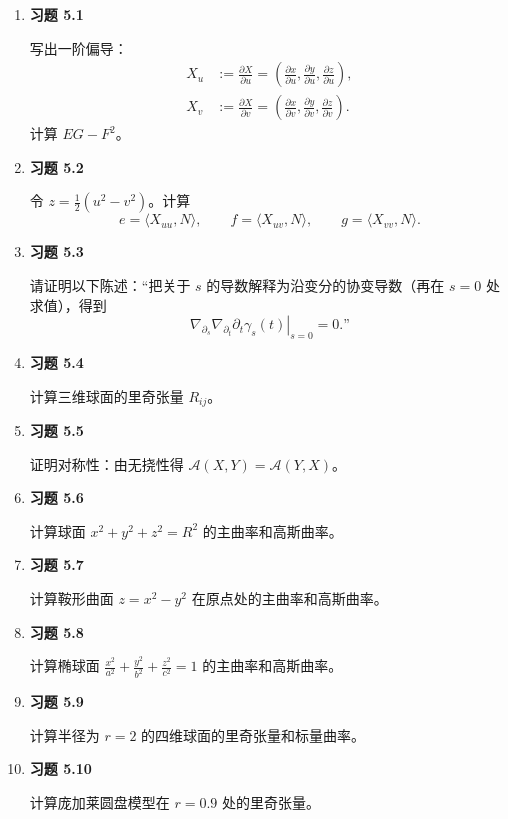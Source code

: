 \begin{enumerate}
  \item \textbf{习题 5.1}\par 写出一阶偏导：
  \[
    \begin{aligned}
      X_u&:=\frac{\partial X}{\partial u}
            =\left(\frac{\partial x}{\partial u},\frac{\partial y}{\partial u},
                    \frac{\partial z}{\partial u}\right),\\
      X_v&:=\frac{\partial X}{\partial v}
            =\left(\frac{\partial x}{\partial v},\frac{\partial y}{\partial v},
                    \frac{\partial z}{\partial v}\right).
    \end{aligned}
  \]
  计算 $EG-F^2$。
  \item \textbf{习题 5.2}\par 令 $z=\frac12(u^2-v^2)$。计算
  \[
    e=\langle X_{uu},N\rangle,\qquad
    f=\langle X_{uv},N\rangle,\qquad g=\langle X_{vv},N\rangle.
  \]
  \item \textbf{习题 5.3}\par 请证明以下陈述：“把关于 $s$ 的导数解释为沿变分的协变导数（再在 $s=0$ 处求值），得到
  \[
    \left.\nabla_{\partial_s}\nabla_{\partial_t}\partial_t\gamma_s(t)\right|_{s=0}=0.\text{”}
  \]
  \item \textbf{习题 5.4}\par 计算三维球面的里奇张量 $R_{ij}$。
  \item \textbf{习题 5.5}\par 证明对称性：由无挠性得 $\mathcal A(X,Y)=\mathcal A(Y,X)$。
  \item \textbf{习题 5.6}\par 计算球面 $x^2+y^2+z^2=R^2$ 的主曲率和高斯曲率。
  \item \textbf{习题 5.7}\par 计算鞍形曲面 $z=x^2-y^2$ 在原点处的主曲率和高斯曲率。
  \item \textbf{习题 5.8}\par 计算椭球面 $\frac{x^2}{a^2}+\frac{y^2}{b^2}+\frac{z^2}{c^2}=1$ 的主曲率和高斯曲率。
  \item \textbf{习题 5.9}\par 计算半径为 $r=2$ 的四维球面的里奇张量和标量曲率。
  \item \textbf{习题 5.10}\par 计算庞加莱圆盘模型在 $r=0.9$ 处的里奇张量。
\end{enumerate}


